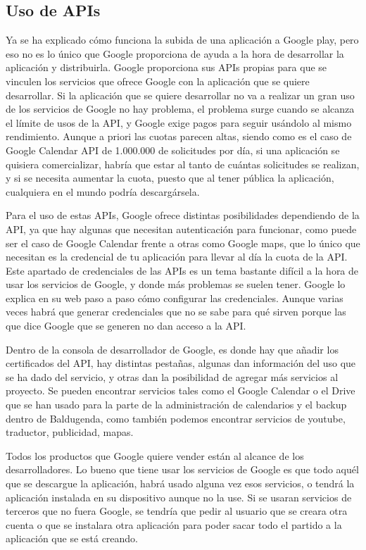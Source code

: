 \subsection{Uso de APIs}
\label{subsecc:Uso de APIs}

Ya se ha explicado cómo funciona la subida de una aplicación a Google play, pero eso no es lo único que Google proporciona de ayuda a la hora de desarrollar la aplicación y distribuirla.
Google proporciona sus APIs propias para que se vinculen los servicios que ofrece Google con la aplicación que se quiere desarrollar. Si la aplicación que se quiere desarrollar no va a realizar un gran uso de los servicios de Google no hay problema, el problema surge cuando se alcanza el límite de usos de la API, y Google exige pagos para seguir usándolo al mismo rendimiento.
Aunque a priori las cuotas parecen altas, siendo como es el caso de Google Calendar API \cite{GCalendar} de 1.000.000 de solicitudes por día, si una aplicación se quisiera comercializar,  habría que estar al tanto de cuántas solicitudes se realizan, y si se necesita aumentar la cuota, puesto que al tener pública la aplicación, cualquiera en el mundo podría descargársela.

Para el uso de estas APIs, Google ofrece distintas posibilidades dependiendo de la API, ya que hay algunas que necesitan autenticación para funcionar, como puede ser el caso de Google Calendar frente a otras como Google maps, que lo único que necesitan es la credencial de tu aplicación para llevar al día la cuota de la API.
Este apartado de credenciales de las APIs es un tema bastante difícil a la hora de usar los servicios de Google, y donde más problemas se suelen tener. Google lo explica en su web paso a paso cómo configurar las credenciales. Aunque varias veces habrá que generar credenciales que no se sabe para qué sirven porque las que dice Google que se generen no dan acceso a la API.

Dentro de la consola de desarrollador de Google, es donde hay que añadir los certificados del API, hay distintas pestañas, algunas dan información del uso que se ha dado del servicio, y otras dan la posibilidad de agregar más servicios al proyecto.
Se pueden encontrar servicios tales como el Google Calendar o el Drive que se han usado para la parte de la administración de calendarios y el backup dentro de Baldugenda, como también podemos encontrar servicios de youtube, traductor, publicidad, mapas. 

Todos los productos que Google quiere vender están al alcance de los desarrolladores.
Lo bueno que tiene usar los servicios de Google es que todo aquél que se descargue la aplicación, habrá usado alguna vez esos servicios, o tendrá la aplicación instalada en su dispositivo aunque no la use. Si se usaran servicios de terceros que no fuera Google, se tendría que pedir al usuario que se creara otra cuenta o que se instalara otra aplicación para poder sacar todo el partido a la aplicación que se está creando.


